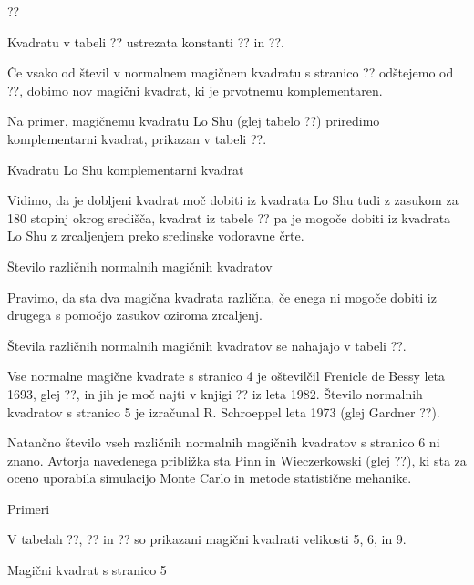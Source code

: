 \documentclass[a4paper,12pt]{article}
\begin{document}
??

Kvadratu v tabeli ?? ustrezata konstanti ?? in ??.

Če vsako od števil v normalnem magičnem kvadratu s stranico ?? odštejemo
od ??, dobimo nov magični kvadrat, ki je prvotnemu komplementaren.

Na primer, magičnemu kvadratu Lo Shu (glej tabelo ??) priredimo
komplementarni kvadrat, prikazan v tabeli ??.

Kvadratu Lo Shu komplementarni kvadrat

Vidimo, da je dobljeni kvadrat moč dobiti iz kvadrata Lo Shu tudi z zasukom za
180 stopinj okrog središča, kvadrat iz tabele ?? pa je mogoče dobiti
iz kvadrata Lo Shu z zrcaljenjem preko sredinske vodoravne črte.

Število različnih normalnih magičnih kvadratov

   Pravimo, da sta dva magična kvadrata različna, če enega ni mogoče dobiti
   iz drugega s pomočjo zasukov oziroma zrcaljenj.

Števila različnih normalnih magičnih kvadratov se nahajajo v tabeli ??.

Vse normalne magične kvadrate s stranico 4 je oštevilčil Frenicle de Bessy
leta 1693, glej ??, in jih je moč najti v knjigi ??
iz leta 1982. Število normalnih kvadratov s stranico 5 je izračunal
R. Schroeppel leta 1973 (glej Gardner ??).

Natančno število vseh različnih normalnih magičnih kvadratov s stranico 6 ni znano.
Avtorja navedenega približka sta Pinn in Wieczerkowski (glej ??), ki
sta za oceno uporabila simulacijo Monte Carlo in metode statistične mehanike.


Primeri

V tabelah ??, ?? in ?? so prikazani
magični kvadrati velikosti 5, 6, in 9.

Magični kvadrat s stranico 5
\end{document}
